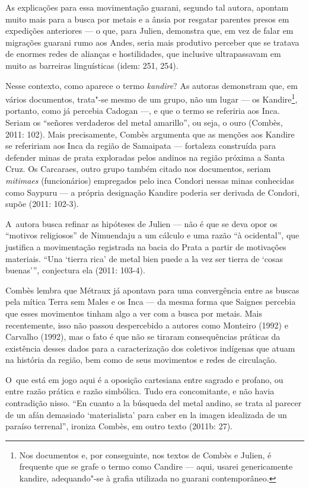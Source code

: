 As explicações para essa movimentação guarani, segundo tal autora,
apontam muito mais para a busca por metais e a ânsia por resgatar
parentes presos em expedições anteriores --- o que, para Julien,
demonstra que, em vez de falar em migrações guarani rumo aos Andes,
seria mais produtivo perceber que se tratava de enormes redes de
alianças e hostilidades, que inclusive ultrapassavam em muito as
barreiras linguísticas (idem: 251, 254).

Nesse contexto, como aparece o termo \emph{kandire}? As autoras demonstram que,
em vários documentos, trata"-se mesmo de um grupo, não um lugar --- os
Kandire\footnote{Nos documentos e, por conseguinte, nos textos de
Combès e Julien, é frequente que se grafe o termo como Candire --- aqui,
usarei genericamente kandire, adequando"-se à grafia utilizada no
guarani contemporâneo.}, portanto, como já percebia Cadogan ---, e que o
termo se referiria aos Inca. Seriam os ``señores verdaderos del metal
amarillo'', ou seja, o ouro (Combès, 2011: 102). Mais precisamente,
Combès argumenta que as menções aos Kandire se refeririam aos Inca da
região de Samaipata --- fortaleza construída para defender minas de prata
exploradas pelos andinos na região próxima a Santa Cruz. Os Carcaraes,
outro grupo também citado nos documentos, seriam \emph{mitimaes}
(funcionários) empregados pelo inca Condori nessas minas conhecidas
como Saypuru --- a própria designação Kandire poderia ser derivada de
Condori, supõe (2011: 102-3).

A~autora busca refinar as hipóteses de Julien --- não é que se deva opor
os ``motivos religiosos'' de Nimuendaju a um cálculo e uma razão ``à
ocidental'', que justifica a movimentação registrada na bacia do Prata a
partir de motivações materiais. ``Una `tierra
rica' de metal bien puede a la vez ser tierra de
`cosas buenas''', conjectura ela
(2011: 103-4).

Combès lembra que Métraux já apontava para uma convergência entre as
buscas pela mítica Terra sem Males e os Inca --- da mesma forma que
Saignes percebia que esses movimentos tinham algo a ver com a busca por
metais. Mais recentemente, isso não passou despercebido a autores como
Monteiro (1992) e Carvalho (1992), mas o fato é que não se tiraram
consequências práticas da existência desses dados para a caracterização
dos coletivos indígenas que atuam na história da região, bem como de
seus movimentos e redes de circulação.

O~que está em jogo aqui é a oposição cartesiana entre sagrado e profano,
ou entre razão prática e razão simbólica. Tudo era concomitante, e não
havia contradição nisso. ``En cuanto a la búsqueda del metal andino, se
trata al parecer de un afán demasiado
`materialista' para caber en la
imagen idealizada de un paraíso terrenal'', ironiza Combès, em outro
texto (2011b: 27).

